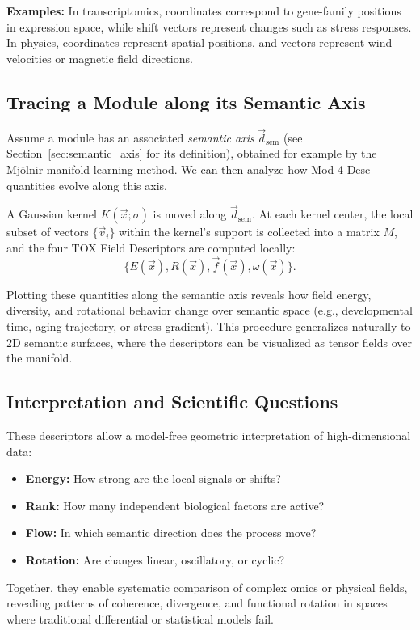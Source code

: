     \textbf{Examples:}  
    In transcriptomics, coordinates correspond to gene-family positions in 
    expression space, while shift vectors represent changes such as stress 
    responses.  
    In physics, coordinates represent spatial positions, and vectors represent wind 
    velocities or magnetic field directions.


    \subsection{Tracing a Module along its Semantic Axis}

        Assume a module has an associated \textit{semantic axis}
        \(\vec{d}_{\text{sem}}\) (see Section~\ref{sec:semantic_axis} for its definition), 
        obtained for example by the Mjölnir manifold learning method.  
        We can then analyze how Mod-4-Desc quantities evolve along this axis.

        A Gaussian kernel \(K(\vec{x}; \sigma)\) is moved along \(\vec{d}_{\text{sem}}\).  
        At each kernel center, the local subset of vectors 
        \( \{\vec{v}_i\} \) within the kernel’s support is collected into a matrix \(M\), 
        and the four TOX Field Descriptors are computed locally:
        \[
            \{E(\vec{x}), R(\vec{x}), \vec{f}(\vec{x}), \omega(\vec{x})\}.
        \]

        Plotting these quantities along the semantic axis reveals how 
        field energy, diversity, and rotational behavior change over semantic space 
        (e.g., developmental time, aging trajectory, or stress gradient).  
        This procedure generalizes naturally to 2D semantic surfaces, 
        where the descriptors can be visualized as tensor fields over the manifold.

    \subsection{Interpretation and Scientific Questions}

        These descriptors allow a model-free geometric interpretation of high-dimensional data:
        \begin{itemize}
            \item \textbf{Energy:} How strong are the local signals or shifts?
            \item \textbf{Rank:} How many independent biological factors are active?
            \item \textbf{Flow:} In which semantic direction does the process move?
            \item \textbf{Rotation:} Are changes linear, oscillatory, or cyclic?
        \end{itemize}

        Together, they enable systematic comparison of complex omics or physical fields, 
        revealing patterns of coherence, divergence, and functional rotation 
        in spaces where traditional differential or statistical models fail.